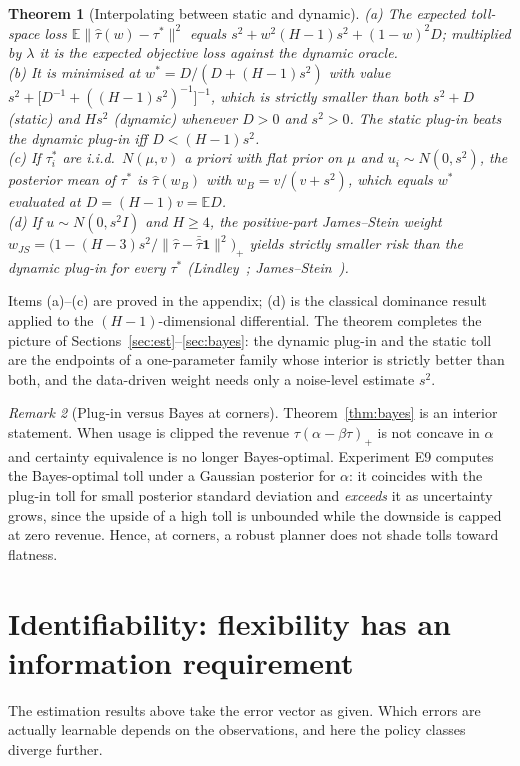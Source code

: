 \documentclass[11pt]{article}
\newtheorem{theorem}{Theorem}[section]
\theoremstyle{definition}
\theoremstyle{remark}
\newtheorem{remark}[theorem]{Remark}
\newcommand{\E}{\mathbb{E}}
\newcommand{\one}{\mathbf{1}}
\begin{document}
\begin{theorem}[Interpolating between static and dynamic]\label{thm:shrink}
(a) The expected toll-space loss $\E\|\hat\tau(w)-\tau^*\|^2$ equals $s^2+w^2(H-1)s^2+(1-w)^2D$; multiplied by $\lambda$ it is the expected objective loss against the dynamic oracle.\\
(b) It is minimised at $w^*=D/(D+(H-1)s^2)$ with value $s^2+\big[D^{-1}+((H-1)s^2)^{-1}\big]^{-1}$, which is strictly smaller than both $s^2+D$ (static) and $Hs^2$ (dynamic) whenever $D>0$ and $s^2>0$. The static plug-in beats the dynamic plug-in iff $D<(H-1)s^2$.\\
(c) If $\tau^*_i$ are i.i.d.\ $N(\mu,v)$ a priori with flat prior on $\mu$ and $u_i\sim N(0,s^2)$, the posterior mean of $\tau^*$ is $\hat\tau(w_B)$ with $w_B=v/(v+s^2)$, which equals $w^*$ evaluated at $D=(H-1)v=\E D$.\\
(d) If $u\sim N(0,s^2I)$ and $H\ge4$, the positive-part James--Stein weight $w_{JS}=\big(1-(H-3)s^2/\|\hat\tau-\bar{\hat\tau}\one\|^2\big)_+$ yields strictly smaller risk than the dynamic plug-in for every $\tau^*$ (Lindley~\cite{lindley1962}; James--Stein~\cite{jamesstein1961}).
\end{theorem}
Items (a)--(c) are proved in the appendix; (d) is the classical dominance result applied to the $(H-1)$-dimensional differential. The theorem completes the picture of Sections~\ref{sec:est}--\ref{sec:bayes}: the dynamic plug-in and the static toll are the endpoints of a one-parameter family whose interior is strictly better than both, and the data-driven weight needs only a noise-level estimate $s^2$.

\begin{remark}[Plug-in versus Bayes at corners]\label{rem:corners}
Theorem~\ref{thm:bayes} is an interior statement. When usage is clipped the revenue $\tau(\alpha-\beta\tau)_+$ is not concave in $\alpha$ and certainty equivalence is no longer Bayes-optimal. Experiment E9 computes the Bayes-optimal toll under a Gaussian posterior for $\alpha$: it coincides with the plug-in toll for small posterior standard deviation and \emph{exceeds} it as uncertainty grows, since the upside of a high toll is unbounded while the downside is capped at zero revenue. Hence, at corners, a robust planner does not shade tolls toward flatness.
\end{remark}

\section{Identifiability: flexibility has an information requirement}\label{sec:ident}
The estimation results above take the error vector as given. Which errors are actually learnable depends on the observations, and here the policy classes diverge further.
\end{document}
